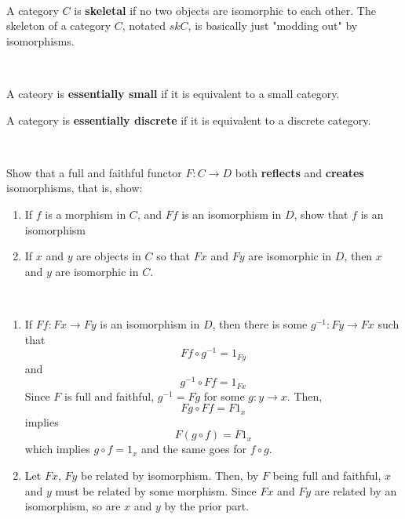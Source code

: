 \documentclass{article}
\begin{document}
\begin{definition}
\

A category $C$ is \textbf{skeletal} if no two objects are isomorphic to each other. The skeleton of a category $C$, notated $skC$, is basically just "modding out" by isomorphisms. 
\end{definition}

\begin{definition}[Essentially \_]
\

A cateory is \textbf{essentially small} if it is equivalent to a small category.

A category is \textbf{essentially discrete} if it is equivalent to a discrete category. 
\end{definition}

\begin{exercise}[Exercise 4]
\

Show that a full and faithful functor $F: C \to D$ both \textbf{reflects} and \textbf{creates} isomorphisms, that is, show:

\begin{enumerate}
    \item If $f$ is a morphism in $C$, and $Ff$ is an isomorphism in $D$, show that $f$ is an isomorphism
    \item If $x$ and $y$ are objects in $C$ so that $Fx$ and $Fy$ are isomorphic in $D$, then $x$ and $y$ are isomorphic in $C$.
\end{enumerate}
\end{exercise}

\begin{solution}
\

\begin{enumerate}
    \item If $Ff: Fx \to Fy$ is an isomorphism in $D$, then there is some $g ^{-1}: Fy \to Fx$ such that $$Ff \circ g ^{-1} = 1_{Fy}$$ and $$g ^{-1} \circ Ff = 1_{Fx}$$Since $F$ is full and faithful, $g ^{-1} = F g$ for some $g: y \to x$. Then, $$Fg \circ Ff = F 1_x$$ implies $$F(g \circ f) = F 1_{x}$$ which implies $g \circ f = 1_x$ and the same goes for $f \circ g$.
    \item Let $Fx$, $Fy$ be related by isomorphism. Then, by $F$ being full and faithful, $x$ and $y$ must be related by some morphism. Since $Fx$ and $Fy$ are related by an isomorphism, so are $x$ and $y$ by the prior part.
\end{enumerate}
\end{solution}
\end{document}
